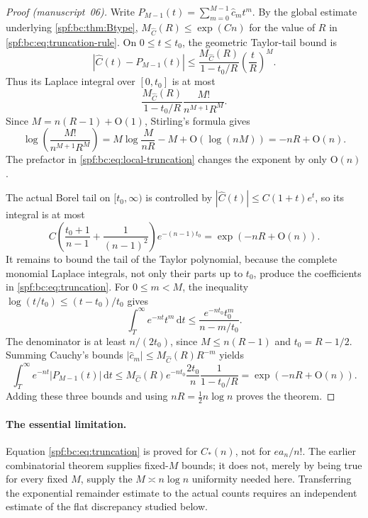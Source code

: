 \documentclass[11pt]{article}
\numberwithin{equation}{section}
\theoremstyle{definition}
\theoremstyle{remark}
\theoremstyle{definition}
\newcommand{\bigO}{\mathrm O}
\newcommand{\bcC}{C_{\!*}}
\begin{document}
\begin{proof}[Proof (manuscript~06)]
Write $P_{M-1}(t)=\sum_{m=0}^{M-1}\hat c_mt^m$. By the global estimate underlying
\cref{spf:bc:thm:Btype}, $M_{\widehat C}(R)\le\exp(Cn)$ for the value of $R$ in
\eqref{spf:bc:eq:truncation-rule}. On $0\le t\le t_0$, the geometric Taylor-tail bound is
\[
 |\widehat C(t)-P_{M-1}(t)|\le
 \frac{M_{\widehat C}(R)}{1-t_0/R}\left(\frac tR\right)^M.
\]
Thus its Laplace integral over $[0,t_0]$ is at most
\begin{equation}
 \frac{M_{\widehat C}(R)}{1-t_0/R}\frac{M!}{n^{M+1}R^M}.
 \label{spf:bc:eq:local-truncation}
\end{equation}
Since $M=n(R-1)+\bigO(1)$, Stirling's formula gives
\[
 \log\left(\frac{M!}{n^{M+1}R^M}\right)
 =M\log\frac{M}{nR}-M+\bigO(\log(nM))
 =-nR+\bigO(n).
\]
The prefactor in \eqref{spf:bc:eq:local-truncation} changes the exponent by only
$\bigO(n)$.

The actual Borel tail on $[t_0,\infty)$ is controlled by
$|\widehat C(t)|\le C(1+t)e^t$, so its integral is at most
\[
 C\left(\frac{t_0+1}{n-1}+\frac1{(n-1)^2}\right)e^{-(n-1)t_0}
 =\exp(-nR+\bigO(n)).
\]
It remains to bound the tail of the Taylor polynomial, because the complete
monomial Laplace integrals, not only their parts up to $t_0$, produce the
coefficients in \eqref{spf:bc:eq:truncation}.
For $0\le m<M$, the inequality
$\log(t/t_0)\le(t-t_0)/t_0$ gives
\[
 \int_T^\infty e^{-nt}t^m\,\mathrm d t
 \le\frac{e^{-nt_0}t_0^m}{n-m/t_0}.
\]
The denominator is at least $n/(2t_0)$, since $M\le n(R-1)$ and
$t_0=R-1/2$. Summing Cauchy's bounds $|\hat c_m|\le M_{\widehat C}(R)R^{-m}$ yields
\[
 \int_T^\infty e^{-nt}|P_{M-1}(t)|\,\mathrm d t
 \le M_{\widehat C}(R)e^{-nt_0}\frac{2t_0}{n}\frac1{1-t_0/R}
 =\exp(-nR+\bigO(n)).
\]
Adding these three bounds and using $nR=\tfrac12n\log n$ proves the theorem.
\end{proof}

\paragraph{The essential limitation.}
Equation \eqref{spf:bc:eq:truncation} is proved for $\bcC(n)$, not for
$e a_n/n!$. The earlier combinatorial theorem supplies fixed-$M$ bounds;
it does not, merely by being true for every fixed $M$, supply the
$M\asymp n\log n$ uniformity needed here. Transferring the exponential
remainder estimate to the actual counts requires an independent estimate of
the flat discrepancy studied below.
\end{document}
